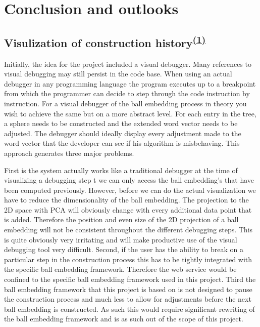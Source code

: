 \chapter{Conclusion and outlooks}

\section[Visulization of construction history]{Visulization of construction history\textsuperscript{\hyperref[Jan]{(1)}}}
Initially, the idea for the project included a visual debugger. Many references to visual debugging may still persist in the code base. When using an actual debugger in any programming language the program executes up to a breakpoint from which the programmer can decide to step through the code instruction by instruction. For a visual debugger of the ball embedding process in theory you wish to achieve the same but on a more abstract level. For each entry in the tree, a sphere needs to be constructed and the extended word vector needs to be adjusted. The debugger should ideally display every adjustment made to the word vector that the developer can see if his algorithm is misbehaving. This approach generates three major problems. 

First is the system actually works like a traditional debugger at the time of visualizing a debugging step t we can only access the ball embedding's that have been computed previously. However, before we can do the actual visualization we have to reduce the dimensionality of the ball embedding. The projection to the 2D space with PCA will obviously change with every additional data point that is added. Therefore the position and even size of the 2D projection of a ball embedding will not be consistent throughout the different debugging steps. This is quite obviously very irritating and will make productive use of the visual debugging tool very difficult.
Second, if the user has the ability to break on a particular step in the construction process this has to be tightly integrated with the specific ball embedding framework. Therefore the web service would be confined to the specific ball embedding framework used in this project. 
Third the ball embedding framework that this project is based on is not designed to pause the construction process and much less to allow for adjustments before the next ball embedding is constructed. As such this would require significant rewriting of the ball embedding framework and is as such out of the scope of this project.

